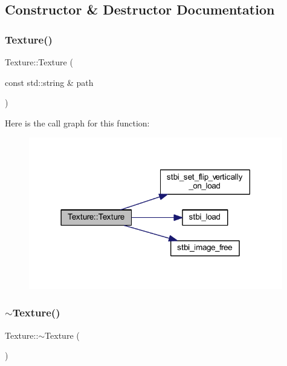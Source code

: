 \subsection{Constructor \& Destructor Documentation}
\mbox{\label{class_texture_a4cd45e8898c02b5a5c790a479233124b}} 
\subsubsection{\texorpdfstring{Texture()}{Texture()}}
{\footnotesize\ttfamily Texture\+::\+Texture (\begin{DoxyParamCaption}\item[{const std\+::string \&}]{path }\end{DoxyParamCaption})}

Here is the call graph for this function\+:
\nopagebreak
\begin{figure}[H]
\begin{center}
\leavevmode
\includegraphics[width=314pt]{class_texture_a4cd45e8898c02b5a5c790a479233124b_cgraph}
\end{center}
\end{figure}
\mbox{\label{class_texture_a09c4bcb7462f64c1d20fa69dba3cee8a}} 
\subsubsection{\texorpdfstring{$\sim$\+Texture()}{~Texture()}}
{\footnotesize\ttfamily Texture\+::$\sim$\+Texture (\begin{DoxyParamCaption}{ }\end{DoxyParamCaption})}



